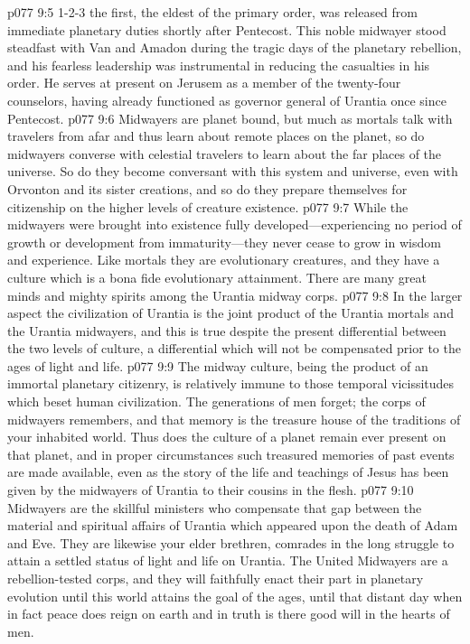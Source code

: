\vs p077 9:5 1\hyp{}2\hyp{}3 the first, the eldest of the primary order, was released from immediate planetary duties shortly after Pentecost. This noble midwayer stood steadfast with Van and Amadon during the tragic days of the planetary rebellion, and his fearless leadership was instrumental in reducing the casualties in his order. He serves at present on Jerusem as a member of the twenty\hyp{}four counselors, having already functioned as governor general of Urantia once since Pentecost.
\pc \vs p077 9:6 Midwayers are planet bound, but much as mortals talk with travelers from afar and thus learn about remote places on the planet, so do midwayers converse with celestial travelers to learn about the far places of the universe. So do they become conversant with this system and universe, even with Orvonton and its sister creations, and so do they prepare themselves for citizenship on the higher levels of creature existence.
\vs p077 9:7 While the midwayers were brought into existence fully developed---experiencing no period of growth or development from immaturity---they never cease to grow in wisdom and experience. Like mortals they are evolutionary creatures, and they have a culture which is a bona fide evolutionary attainment. There are many great minds and mighty spirits among the Urantia midway corps.
\vs p077 9:8 In the larger aspect the civilization of Urantia is the joint product of the Urantia mortals and the Urantia midwayers, and this is true despite the present differential between the two levels of culture, a differential which will not be compensated prior to the ages of light and life.
\vs p077 9:9 The midway culture, being the product of an immortal planetary citizenry, is relatively immune to those temporal vicissitudes which beset human civilization. The generations of men forget; the corps of midwayers remembers, and that memory is the treasure house of the traditions of your inhabited world. Thus does the culture of a planet remain ever present on that planet, and in proper circumstances such treasured memories of past events are made available, even as the story of the life and teachings of Jesus has been given by the midwayers of Urantia to their cousins in the flesh.
\vs p077 9:10 Midwayers are the skillful ministers who compensate that gap between the material and spiritual affairs of Urantia which appeared upon the death of Adam and Eve. They are likewise your elder brethren, comrades in the long struggle to attain a settled status of light and life on Urantia. The United Midwayers are a rebellion\hyp{}tested corps, and they will faithfully enact their part in planetary evolution until this world attains the goal of the ages, until that distant day when in fact peace does reign on earth and in truth is there good will in the hearts of men.
